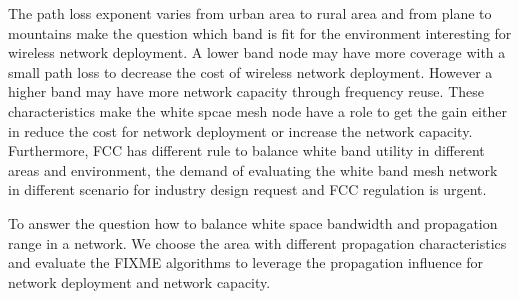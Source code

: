 The path loss exponent varies from urban area to rural area and from plane to mountains make the question which band is fit for the environment interesting for wireless network deployment.
A lower band node may have more coverage with a small path loss to decrease the cost of wireless network deployment. However a higher band may have more network capacity through frequency reuse.
These characteristics make the white spcae mesh node have a role to get the gain either in reduce the cost for network deployment or increase the network capacity.
Furthermore, FCC has different rule to balance white band utility in different areas and environment, the demand of evaluating the white band mesh network in different scenario for industry design request and FCC regulation is urgent.

To answer the question how to balance white space bandwidth and propagation range in a network.  
We choose the area with different propagation characteristics and evaluate the FIXME algorithms to leverage the propagation influence for network deployment and network capacity.
